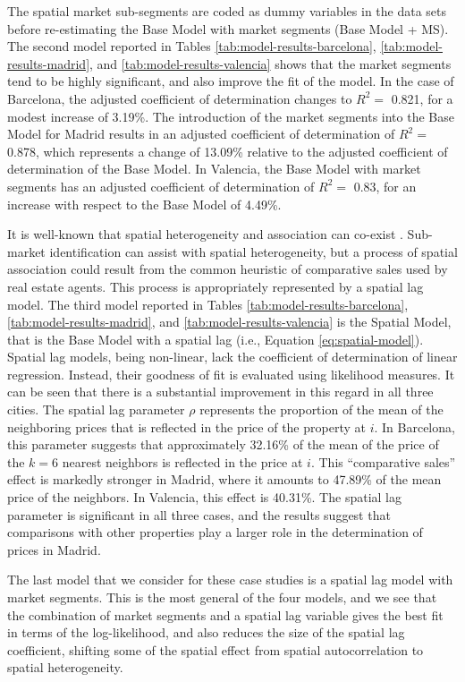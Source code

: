 \documentclass[Royal,times,sageh]{sagej}
\begin{document}
The spatial market sub-segments are coded as dummy variables in the data
sets before re-estimating the Base Model with market segments (Base
Model + MS). The second model reported in Tables
\ref{tab:model-results-barcelona}, \ref{tab:model-results-madrid}, and
\ref{tab:model-results-valencia} shows that the market segments tend to
be highly significant, and also improve the fit of the model. In the
case of Barcelona, the adjusted coefficient of determination changes to
\(R^2=\) 0.821, for a modest increase of 3.19\%. The introduction of the
market segments into the Base Model for Madrid results in an adjusted
coefficient of determination of \(R^2=\) 0.878, which represents a
change of 13.09\% relative to the adjusted coefficient of determination
of the Base Model. In Valencia, the Base Model with market segments has
an adjusted coefficient of determination of \(R^2=\) 0.83, for an
increase with respect to the Base Model of 4.49\%.

It is well-known that spatial heterogeneity and association can co-exist
\citep[e.g.,][]{Bourassa2007spatial, Paez2001spatial}. Sub-market
identification can assist with spatial heterogeneity, but a process of
spatial association could result from the common heuristic of
comparative sales used by real estate agents. This process is
appropriately represented by a spatial lag model. The third model
reported in Tables \ref{tab:model-results-barcelona},
\ref{tab:model-results-madrid}, and \ref{tab:model-results-valencia} is
the Spatial Model, that is the Base Model with a spatial lag (i.e.,
Equation \ref{eq:spatial-model}). Spatial lag models, being non-linear,
lack the coefficient of determination of linear regression. Instead,
their goodness of fit is evaluated using likelihood measures. It can be
seen that there is a substantial improvement in this regard in all three
cities. The spatial lag parameter \(\rho\) represents the proportion of
the mean of the neighboring prices that is reflected in the price of the
property at \(i\). In Barcelona, this parameter suggests that
approximately 32.16\% of the mean of the price of the \(k=6\) nearest
neighbors is reflected in the price at \(i\). This ``comparative sales''
effect is markedly stronger in Madrid, where it amounts to 47.89\% of
the mean price of the neighbors. In Valencia, this effect is 40.31\%.
The spatial lag parameter is significant in all three cases, and the
results suggest that comparisons with other properties play a larger
role in the determination of prices in Madrid.

The last model that we consider for these case studies is a spatial lag
model with market segments. This is the most general of the four models,
and we see that the combination of market segments and a spatial lag
variable gives the best fit in terms of the log-likelihood, and also
reduces the size of the spatial lag coefficient, shifting some of the
spatial effect from spatial autocorrelation to spatial heterogeneity.
\end{document}
